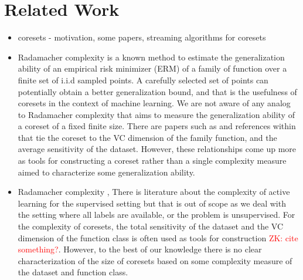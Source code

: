 \documentclass[anon,12pt]{colt2019} %
\newcommand{\zk}[1]{\textcolor{red}{ZK: #1}}
\begin{document}
\section{Related Work}
\begin{itemize}
\item coresets - motivation, some papers, streaming algorithms for coresets

\item Radamacher complexity \cite{Bartlett:2003:RGC:944919.944944} is a known method to estimate the generalization ability of an empirical risk minimizer (ERM) of a family of function over a finite set of i.i.d sampled points. A carefully selected set of points can potentially obtain a better generalization bound, and that is the usefulness of coresets in the context of machine learning. We are not aware of any analog to Radamacher complexity that aims to measure the generalization ability of a coreset of a fixed finite size. There are papers such as \cite{tolochinsky2018coresets} and references within that tie the coreset to the VC dimension of the family function, and the average sensitivity of the dataset. However, these relationships come up more as tools for constructing a coreset rather than a single complexity measure aimed to characterize some generalization ability.
%


\item Radamacher complexity \cite{Bartlett:2003:RGC:944919.944944}, There is literature about the complexity of active learning for the supervised setting but that is out of scope as we deal with the setting where all labels are available, or the problem is unsupervised. For the complexity of coresets, the total sensitivity of the dataset and the VC dimension of the function class is often used as tools for construction \zk{cite something?}. However, to the best of our knowledge there is no clear characterization of the size of coresets based on some complexity measure of the dataset and function class.


\end{itemize}
\end{document}
